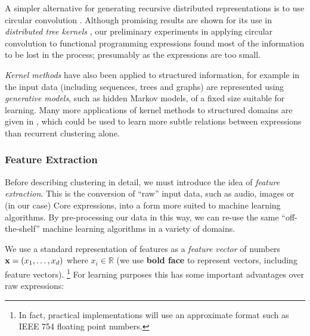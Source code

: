 A simpler alternative for generating recursive distributed representations is to
use circular convolution \cite{conf/ijcai/Plate91}. Although promising results
are shown for its use in \emph{distributed tree kernels}
\cite{zanzotto2012distributed}, our preliminary experiments in applying
circular convolution to functional programming expressions found most of the
information to be lost in the process; presumably as the expressions are too
small.

\emph{Kernel methods} have also been applied to structured information, for
example in \cite{Gartner2003} the input data (including sequences, trees and
graphs) are represented using \emph{generative models}, such as hidden Markov
models, of a fixed size suitable for learning. Many more applications of kernel
methods to structured domains are given in \cite{bakir2007predicting}, which
could be used to learn more subtle relations between expressions than recurrent
clustering alone.


\subsubsection{Feature Extraction}
\label{sec:featureextraction}

Before describing clustering in detail, we must introduce the idea of
\emph{feature extraction}. This is the conversion of ``raw'' input data, such as
audio, images or (in our case) Core expressions, into a form more suited to
machine learning algorithms. By pre-processing our data in this way, we can
re-use the same ``off-the-shelf'' machine learning algorithms in a variety of
domains.

We use a standard representation of features as a \emph{feature vector} of
numbers $\mathbf{x} = (x_1, \dots, x_d)$ where $x_i \in \mathbb{R}$ (we use
\textbf{bold face} to represent vectors, including feature
vectors). \footnote{In fact, practical implementations will use an approximate
  format such as IEEE 754 floating point numbers.} For learning purposes this
has some important advantages over raw expressions:

